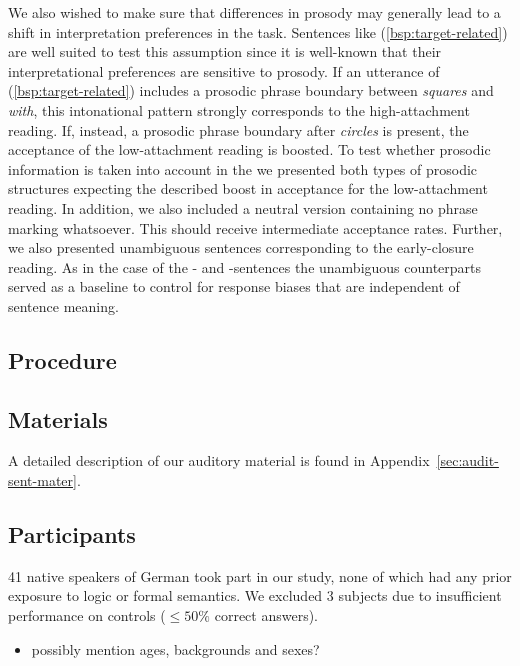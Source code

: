\documentclass[fleqn,reqno,10pt,draft]{article}
\newcommand{\as}{\acro{as}}
\renewcommand{\es}{\acro{es}}
\begin{document}
We also wished to make sure that differences in prosody may generally
lead to a shift in interpretation preferences in the 
task. Sentences like (\ref{bsp:target-related}) are well suited to
test this assumption since it is well-known that their
interpretational preferences are sensitive to prosody. If an utterance
of (\ref{bsp:target-related}) includes a prosodic phrase boundary
between {\it squares} and {\it with}, this intonational pattern
strongly corresponds to the high-attachment reading. If, instead, a
prosodic phrase boundary after {\it circles} is present, the
acceptance of the low-attachment reading is boosted. To test whether
prosodic information is taken into account in the  we
presented both types of prosodic structures expecting the described
boost in acceptance for the low-attachment reading. In addition, we
also included a neutral version containing no phrase marking
whatsoever. This should receive intermediate acceptance
rates. Further, we also presented unambiguous sentences corresponding
to the early-closure reading. As in the case of the \as- and
\es-sentences the unambiguous counterparts served as a baseline to
control for response biases that are independent of sentence meaning.


\subsection{Procedure}
\label{sec:procedure}   

\subsection{Materials}
\label{sec:materials}



A detailed description of our auditory material is found in
Appendix~\ref{sec:audit-sent-mater}. 


\subsection{Participants}
\label{sec:participants} 

41 native speakers of German took part in our study, none of which had
any prior exposure to logic or formal semantics. We excluded 3
subjects due to insufficient performance on controls ($\le 50\%$
correct answers). 

\begin{itemize}
\item possibly mention ages, backgrounds and sexes?
\end{itemize}
\end{document}
